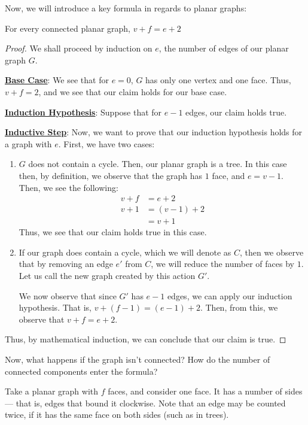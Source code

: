 \documentclass[openany]{book}
\begin{document}
Now, we will introduce a key formula in regards to planar graphs:
\begin{thm}
	For every connected planar graph, $v + f = e + 2$
\end{thm}
\begin{proof}
	We shall proceed by induction on $e$, the number of edges of our planar graph $G$.
	
	\textbf{\underline{Base Case}}: We see that for $e=0$, $G$ has only one vertex and one face. Thus, $v+f=2$, and we see that our claim holds for our base case.
	
	\textbf{\underline{Induction Hypothesis}}: Suppose that for $e-1$ edges, our claim holds true. 
	
	\textbf{\underline{Inductive Step}}: Now, we want to prove that our induction hypothesis holds for a graph with $e$. First, we have two cases:
	\begin{enumerate}
		\item $G$ does not contain a cycle. Then, our planar graph is a tree. In this case then, by definition, we observe that the graph has $1$ face, and $e=v-1$. Then, we see the following:
		\begin{align*}
			v + f &= e + 2 \\
			v + 1 &= (v-1) + 2 \\
			&= v + 1
		\end{align*}
		Thus, we see that our claim holds true in this case.
		
		\item If our graph does contain a cycle, which we will denote as $C$, then we observe that by removing an edge $e'$ from $C$, we will reduce the number of faces by $1$. Let us call the new graph created by this action $G'$.
		
		We now observe that since $G'$ has $e-1$ edges, we can apply our induction hypothesis. That is, $v+(f-1)=(e-1)+2$. Then, from this, we observe that $v+f = e+2$.
	\end{enumerate}

	Thus, by mathematical induction, we can conclude that our claim is true.
\end{proof}

Now, what happens if the graph isn't connected? How do the number of connected components enter the formula?

Take a planar graph with $f$ faces, and consider one face. It has a number of sides --- that is, edges that bound it clockwise. Note that an edge may be counted twice, if it has the same face on both sides (such as in trees).
\end{document}
